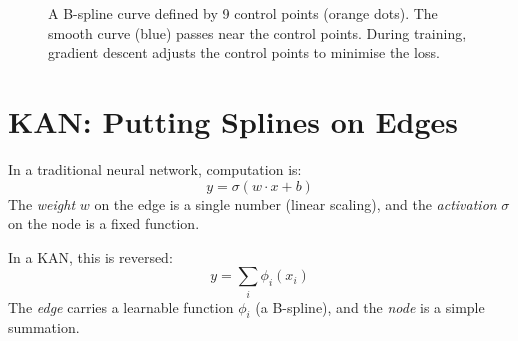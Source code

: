 \begin{figure}[htbp]
\centering
{}
\caption{A B-spline curve defined by 9 control points (orange dots).
  The smooth curve (blue) passes near the control points. During
  training, gradient descent adjusts the control points to minimise
  the loss.}
\label{fig:bspline}
\end{figure}


\section{KAN: Putting Splines on Edges}
\label{sec:kan}

In a traditional neural network, computation is:
\begin{equation}
  y = \sigma(w \cdot x + b)
  \label{eq:trad-neuron-recap}
\end{equation}
The \emph{weight} $w$ on the edge is a single number (linear
scaling), and the \emph{activation} $\sigma$ on the node is a fixed
function.

In a KAN, this is reversed:
\begin{equation}
  y = \sum_{i} \phi_i(x_i)
  \label{eq:kan-neuron}
\end{equation}
The \emph{edge} carries a learnable function $\phi_i$ (a B-spline),
and the \emph{node} is a simple summation.

